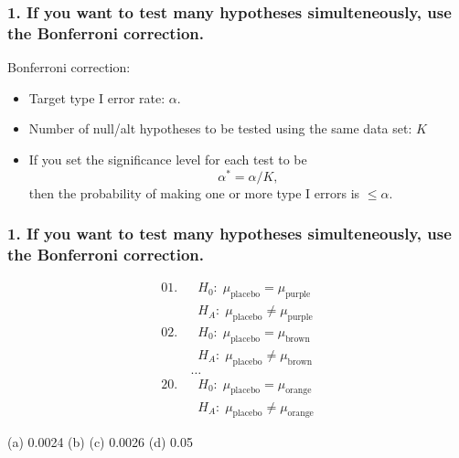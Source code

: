 \documentclass[slidestop,compress,mathserif,12pt,t,professionalfonts,xcolor=table]{beamer}
\newcommand{\solnMult}[1]{
\only<1>{#1}
\only<2->{\red{\textbf{#1}}}
}
\newcommand{\bonferroni}{If you want to test many hypotheses simulteneously, use
  the Bonferroni correction.}
\begin{document}

\begin{frame}
  \frametitle{1. \bonferroni}

\vfill

Bonferroni correction: 
\begin{itemize}
\item Target type I error rate: $\alpha$.

\item Number of null/alt hypotheses to be tested using the same data set: $K$

\item If you set the significance level for each test to be
\[
\alpha^* = \alpha / K,
\]
then the probability of making one or more type I errors is $ \leq \alpha$.

\end{itemize}

\vfill

\end{frame}


\begin{frame}
  \frametitle{1. \bonferroni}

\vspace{-0.5cm}
{\small
\begin{align*}
01.\ &  \; \; H_0: \; \mu_{\text{placebo}} = \mu_{\text{purple}} \\
     &  \; \; H_A: \; \mu_{\text{placebo}} \neq \mu_{\text{purple}}  \\
02.\ &  \; \; H_0: \; \mu_{\text{placebo}} = \mu_{\text{brown}} \\
     &  \; \; H_A: \; \mu_{\text{placebo}} \neq \mu_{\text{brown}}  \\
& \ldots \\
20.\ &  \; \; H_0: \; \mu_{\text{placebo}} = \mu_{\text{orange}} \\
     &  \; \; H_A: \; \mu_{\text{placebo}} \neq \mu_{\text{orange}} 
\end{align*}
}

\begin{center}
(a) 0.0024 \; (b) \solnMult{0.0025} (c) 0.0026 \; (d) 0.05
\end{center}

\end{frame}
\end{document}
